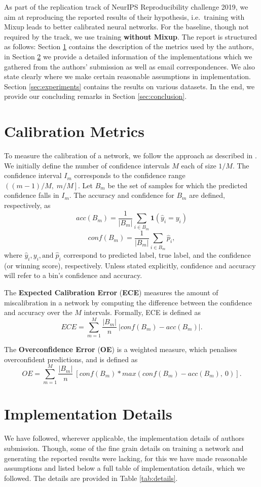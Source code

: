 \documentclass{article}
\begin{document}
As part of the replication track of NeurIPS Reproducibility challenge 2019, we aim at reproducing the reported results of their hypothesis, i.e.\ training with Mixup leads to better calibrated neural networks. For the baseline, though not required by the track, we use training \textbf{without Mixup}. The report is structured as follows: Section \ref{sec:metrics} contains the description of the metrics used by the authors, in Section \ref{sec:implementation} we provide a detailed information of the implementations which we gathered from the authors' submission as well as email correspondences. We also state clearly where we make certain reasonable assumptions in implementation. Section \ref{sec:experiments} contains the results on various datasets. In the end, we provide our concluding remarks in Section \ref{sec:conclusion}.


\section{Calibration Metrics}
\label{sec:metrics}
To measure the calibration of a network, we follow the approach as described in \cite{calibration}. 
We initially define the number of confidence intervals $M$ each of size $1/M$. The confidence interval $I_m$ corresponds to the confidence range $\left((m-1)/M,\; m/M\right]$. Let $B_m$ be the set of samples for which the predicted confidence falls in $I_m$. The accuracy and confidence for $B_m$ are defined, respectively, as
\[ acc(B_m) = \frac{1}{|B_m|} \sum_{i \in B_m}\bm{1}(\hat{y}_i = y_i) \]
\[ conf(B_m) = \frac{1}{|B_m|} \sum_{i \in B_m}\hat{p}_i, \]
where $\hat{y}_i, y_i, \text{and}\; \hat{p}_i $ correspond to predicted label, true label, and the confidence (or winning score), respectively. Unless stated explicitly, confidence and accuracy will refer to a bin's confidence and accuracy.

The \textbf{Expected Calibration Error} (\textbf{ECE}) measures the amount of miscalibration in a network by computing the difference between the confidence and accuracy over the $M$ intervals. Formally, ECE is defined as
\[ ECE = \sum_{m=1}^{M} \frac{|B_m|}{n} \: \Big| conf(B_m) - acc(B_m)\Big|. \]

The \textbf{Overconfidence Error} (\textbf{OE}) is a weighted measure, which penalises overconfident predictions, and is defined as
\[ OE = \sum_{m=1}^{M} \frac{|B_m|}{n} \: \left[ conf(B_m) *max\left(conf(B_m)-acc(B_m),\: 0\right) \right]. \]


\section{Implementation Details}
\label{sec:implementation}
We have followed, wherever applicable, the implementation details of authors submission. Though, some of the fine grain details on training a network and generating the reported results were lacking, for this we have made reasonable assumptions and listed below a full table of implementation details, which we followed. The details are provided in Table \ref{tab:details}.
\end{document}
